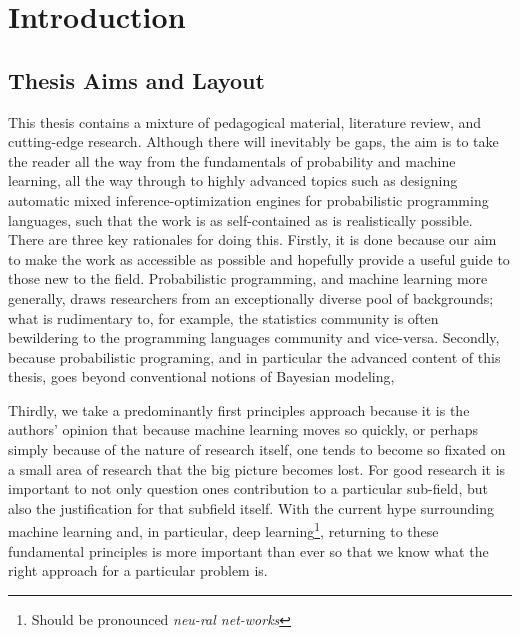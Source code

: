 
\chapter{Introduction}
\label{chp:intro}



\section{Thesis Aims and Layout}

This thesis contains a mixture of pedagogical material, literature review, and 
cutting-edge research.
Although there will inevitably be gaps, the aim is to take
the reader all the way from the fundamentals of probability and machine learning,
all the way through to highly advanced topics such as designing automatic
mixed inference-optimization engines for probabilistic programming languages,
such that the work is as self-contained as is realistically possible.  There are
three key rationales for doing this.  Firstly, it is done because our aim to make the work 
as accessible as possible and hopefully provide a useful guide to those new to the field.
Probabilistic programming, and machine learning more generally, draws
researchers from an exceptionally diverse pool of backgrounds; what is rudimentary
to, for example, the statistics community is often bewildering to the programming
languages community and vice-versa. Secondly, because probabilistic programing, and 
in particular the advanced content of this thesis, goes beyond conventional notions of
Bayesian modeling, 

Thirdly, we take a predominantly first principles approach because it is the authors' 
opinion that because machine learning moves so quickly, or perhaps simply because
of the nature of research itself, one tends to become so fixated on a small area of
research that the big picture becomes lost.  For good research it is important to not
only question ones contribution to a particular sub-field, but also the justification for
that subfield itself.  With the current hype surrounding machine learning and, in particular,
deep learning\footnote{Should be pronounced \emph{neu-ral net-works}}, returning to these
fundamental principles is more important than ever so that we know what the right approach
for a particular problem is.